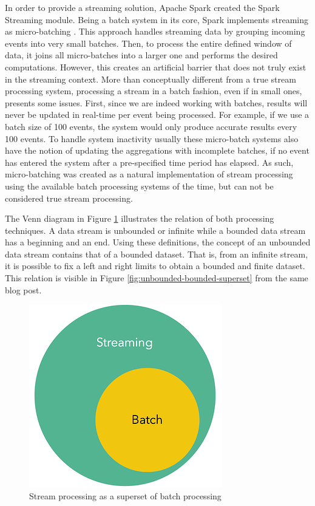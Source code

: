 In order to provide a streaming solution, Apache Spark created the Spark Streaming \cite{SparkStreaming} module. Being a batch system in its core, Spark implements streaming as micro-batching \cite{SparkStreamingPaper}. This approach handles streaming data by grouping incoming events into very small batches. Then, to process the entire defined window of data, it joins all micro-batches into a larger one and performs the desired computations. However, this creates an artificial barrier that does not truly exist in the streaming context. More than conceptually different from a true stream processing system, processing a stream in a batch fashion, even if in small ones, presents some issues. First, since we are indeed working with batches, results will never be updated in real-time per event being processed. For example, if we use a batch size of 100 events, the system would only produce accurate results every 100 events. To handle system inactivity usually these micro-batch systems also have the notion of updating the aggregations with incomplete batches, if no event has entered the system after a pre-specified time period has elapsed. As such, micro-batching was created as a natural implementation of stream processing using the available batch processing systems of the time, but can not be considered true stream processing.

The Venn diagram in Figure \ref{fig:stream-superset} \cite{batch-is-a-special-case-of-streaming} illustrates the relation of both processing techniques. A data stream is unbounded or infinite while a bounded data stream has a beginning and an end. Using these definitions, the concept of an unbounded data stream contains that of a bounded dataset. That is, from an infinite stream, it is possible to fix a left and right limits to obtain a bounded and finite dataset. This relation is visible in Figure \ref{fig:unbounded-bounded-superset} from the same blog post.

\begin{figure}[!htb]
    \begin{center}
      \includegraphics[scale=0.5]{figures/streaming-subset-batch.png}
      \caption[Stream processing as a superset of batch processing]{Stream processing as a superset of batch processing \cite{batch-is-a-special-case-of-streaming}}
      \label{fig:stream-superset}
    \end{center}
\end{figure}

